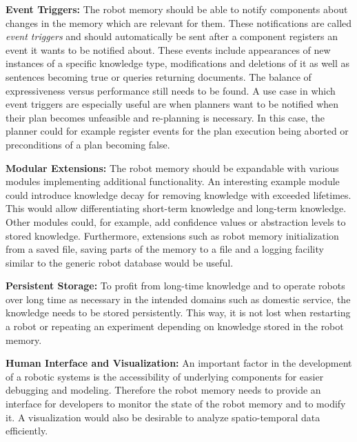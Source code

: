\documentclass[a4paper,11pt]{article}
\begin{document}
\smallskip
\textbf{Event Triggers:} The robot memory should be able to notify
components about changes in the memory which are relevant for
them. These notifications are called \emph{event triggers} and should
automatically be sent after a component registers an event it wants to
be notified about. These events include appearances of new instances
of a specific knowledge type, modifications and deletions of it as
well as sentences becoming true or queries returning documents. The
balance of expressiveness versus performance still needs to be
found. A use case in which event triggers are especially useful are
when planners want to be notified when their plan becomes unfeasible
and re-planning is necessary. In this case, the planner could for
example register events for the plan execution being aborted or
preconditions of a plan becoming false.

\smallskip
\textbf{Modular Extensions:} The robot memory should be expandable
with various modules implementing additional functionality. An
interesting example module could introduce knowledge decay for
removing knowledge with exceeded lifetimes. This would allow
differentiating short-term knowledge and long-term knowledge. Other
modules could, for example, add confidence values or abstraction
levels to stored knowledge. Furthermore, extensions such as robot
memory initialization from a saved file, saving parts of the memory to
a file and a logging facility similar to the generic robot database
would be useful.


\smallskip
\textbf{Persistent Storage:} To profit from long-time knowledge and to
operate robots over long time as necessary in the intended domains
such as domestic service, the knowledge needs to be stored
persistently. This way, it is not lost when restarting a robot or
repeating an experiment depending on knowledge stored in the robot
memory.

\smallskip
\textbf{Human Interface and Visualization:} An important factor in the
development of a robotic systems is the accessibility of underlying
components for easier debugging and modeling. Therefore the robot
memory needs to provide an interface for developers to monitor the
state of the robot memory and to modify it. A visualization would also
be desirable to analyze spatio-temporal data efficiently.
\end{document}
